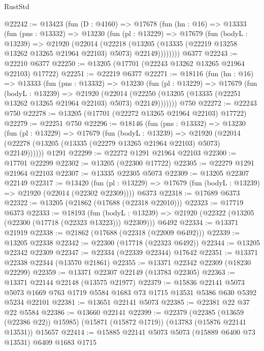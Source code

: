 \begin{lexlean}{RustStd}
\begin{coremodule}
@22242 := @13423
    (fun (D : @4160) =>
    @17678
      (fun (hn : @16) =>
      @13333
        (fun (pns : @13332) =>
        @13230
          (fun (pl : @13229) =>
          @17679
            (fun (bodyL : @13239) =>
            @21920
              (@22014
                (@22218
                  (@13205 (@13335 (@22219 @13258 @13262 @13265 @21964 @22103) @5073) @22149))))))))
    @6377
@22243 := @22210 @6377
@22250 := @13205 (@17701 (@22243 @13262 @13265 @21964 @22103) @17722)
@22251 := @22219 @6377
@22271 := @18116
    (fun (hn : @16) =>
    @13333
      (fun (pns : @13332) =>
      @13230
        (fun (pl : @13229) =>
        @17679
          (fun (bodyL : @13239) =>
          @21920
            (@22014
              (@22250 (@13205 (@13335 (@22251 @13262 @13265 @21964 @22103) @5073) @22149)))))))
    @750
@22272 := @22243 @750
@22278 := @13205 (@17701 (@22272 @13265 @21964 @22103) @17722)
@22279 := @22251 @750
@22296 := @18146
    (fun (pns : @13332) =>
    @13230
      (fun (pl : @13229) =>
      @17679
        (fun (bodyL : @13239) =>
        @21920 (@22014 (@22278 (@13205 (@13335 (@22279 @13265 @21964 @22103) @5073) @22149))))))
    @1291
@22299 := @22272 @1291 @21964 @22103
@22300 := @17701 @22299
@22302 := @13205 (@22300 @17722)
@22305 := @22279 @1291 @21964 @22103
@22307 := @13335 @22305 @5073
@22309 := @13205 @22307 @22149
@22317 := @13420
    (fun (pl : @13229) => @17679 (fun (bodyL : @13239) => @21920 (@22014 (@22302 @22309))))
    @6373
@22318 := @17689 @6373
@22322 := @13205 (@21862 (@17688 (@22318 @22010)))
@22323 := @17719 @6373
@22333 := @18193
    (fun (bodyL : @13239) => @21920 (@22322 (@13205 (@22300 (@17718 (@22323 @13223))) @22309)))
    @6492
@22334 := @13371 @21919
@22338 := @21862 (@17688 (@22318 (@22009 @6492)))
@22339 := @13205 @22338
@22342 := @22300 (@17718 (@22323 @6492))
@22344 := @13205 @22342 @22309
@22347 := @22334 (@22339 @22344) @17642
@22351 := @13371 @22338 @22344 (@13570 @21861)
@22355 := @13371 @22342 @22309 (@18230 @22299)
@22359 := @13371 @22307 @22149 (@13783 @22305)
@22363 := @13371 @22144 @22148 (@13575 @21977)
@22379 := @15836
    @22141
    @5073
    @5073
    @1669
    @763
    @1719
    @5584
    @1683
    @73
    @1715
    @13531
    @5386
    @630
    @5392
    @5234
    @22101
@22381 := @13651 @22141 @5073
@22385 := @22381 @22 @37 @22 @5584
@22386 := @13660 @22141
@22399 := @22379
    (@22385 (@13659 (@22386 @22)) @15985)
    (@15871 (@15872 @1719))
    (@13783 (@15876 @22141 @13531))
    @15657
@22414 := @15885
    @22141
    @5073
    @5073
    (@15889 @6400 @73 @13531)
    @6409
    @1683
    @1715

\end{coremodule}
\end{lexlean}
